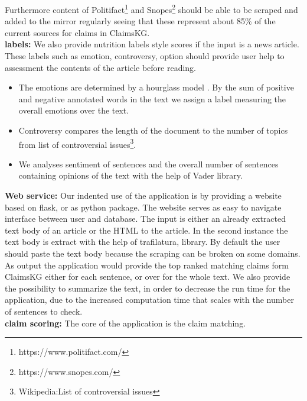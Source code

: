 \documentclass{article}
\begin{document}
Furthermore content of Politifact\footnote{https://www.politifact.com/} and Snopes\footnote{https://www.snopes.com/} should be able to be scraped and added to the mirror regularly seeing that these represent about 85\% of the current sources for claims in ClaimsKG. \\
\noindent\textbf{labels:}
We also provide nutrition labels style scores if the input is a news article.
These labels such as emotion, controversy, option should provide user help to assessment the contents of the article before reading.
\begin{itemize}
	\item The emotions are determined by a hourglass model \cite{DBLP:conf/cost/CambriaLH11}. By the sum of positive and negative annotated words in the text we assign a label measuring the overall emotions over the text.
	\item Controversy compares the length of the document to the number of topics from list of controversial issues\footnote{Wikipedia:List of controversial issues}.
	\item We analyses sentiment of sentences and the overall number of sentences containing opinions of the text with the help of Vader\cite{DBLP:conf/icwsm/HuttoG14} library.
\end{itemize}
\noindent\textbf{Web service:}
Our indented use of the application is by providing a website based on flask, or as python package.
The website serves as easy to navigate interface between user and database.
The input is either an already extracted text body of an article or the HTML to the article.
In the second instance the text body is extract with the help of trafilatura\cite{DBLP:conf/konvens/Barbaresi19}, \cite{DBLP:conf/aclwac/Barbaresi16} library.
By default the user should paste the text body because the scraping can be broken on some domains.
As output the application would provide the top ranked matching claims form ClaimsKG either for each sentence, or over for the whole text.
We also provide the possibility to summarize the text, in order to decrease the run time for the application, due to the increased computation time that scales with the number of sentences to check. \\
\noindent\textbf{claim scoring:}
The core of the application is the claim matching.
\end{document}
